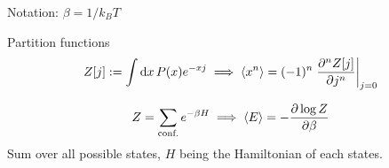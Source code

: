 \documentclass{article}
\begin{document}
Notation: $\beta = 1/k_BT$

\begin{multicols}{2}

Partition functions
\begin{gather}
    Z[j] := \int\dd{x} P(x) e^{-xj} \implies \langle x^n \rangle = (-1)^n \eval{\pdv[n]{Z[j]}{j}}_{j=0}
\end{gather}

\begin{gather}
    Z = \sum_{\text{conf.}} e^{-\beta H} \implies \langle E \rangle = -\pdv{\log Z}{\beta}
\end{gather}
Sum over all possible states, $H$ being the Hamiltonian of each states.

\end{multicols}
\end{document}
